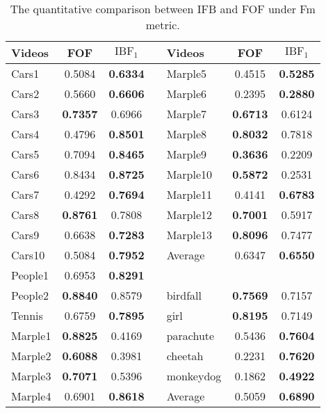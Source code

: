 \begin{table}[!t]				%
\caption{The quantitative comparison between IFB and FOF \cite{6751306_2013_ICCV} under Fm metric.}
\label{tab_ICCV}
\centering
\begin{tabular}{lcc|clcc}
\hline
Videos   & FOF\cite{6751306_2013_ICCV} & $\text{IBF}_1$  & & Videos & FOF\cite{6751306_2013_ICCV} & $\text{IBF}_1$ \\
\hline
Cars1   &  0.5084 &   \textbf{0.6334} & &  Marple5   &  0.4515 &  \textbf{0.5285} \\
Cars2   &  0.5660 &   \textbf{0.6606} & &  Marple6   &  0.2395 &  \textbf{0.2880} \\
Cars3   &   \textbf{0.7357} &  0.6966 & &  Marple7   &  \textbf{0.6713} &  0.6124 \\
Cars4   &  0.4796 &  \textbf{0.8501} & &  Marple8   &  \textbf{0.8032} &  0.7818 \\
Cars5   &  0.7094 &  \textbf{0.8465} & &  Marple9   &  \textbf{0.3636} &  0.2209 \\
Cars6   &  0.8434 &  \textbf{0.8725} & &  Marple10  &  \textbf{0.5872} &  0.2531 \\
Cars7   &  0.4292 &  \textbf{0.7694} & &  Marple11  &  0.4141 &  \textbf{0.6783} \\
Cars8   &  \textbf{0.8761} &  0.7808 & &  Marple12  &  \textbf{0.7001} &  0.5917 \\
Cars9   &  0.6638 &  \textbf{0.7283} & &  Marple13  &  \textbf{0.8096} &  0.7477 \\
\cline{5-7}
Cars10  &  0.5084 &  \textbf{0.7952} & &  Average   &  0.6347 &  \textbf{0.6550} \\
\cline{4-7}
People1 &  0.6953 &  \textbf{0.8291}                &         &         \\
\cline{4-7}
People2 &  \textbf{0.8840} &  0.8579 & &  birdfall  &  \textbf{0.7569} &  0.7157 \\
Tennis  &  0.6759 &  \textbf{0.7895} & &  girl      &  \textbf{0.8195} &  0.7149 \\
Marple1 &  \textbf{0.8825} &  0.4169 & &  parachute &  0.5436 &  \textbf{0.7604} \\
Marple2 &  \textbf{0.6088} &  0.3981 & &  cheetah   &  0.2231 &  \textbf{0.7620} \\
Marple3 &  \textbf{0.7071} &  0.5396 & &  monkeydog &  0.1862 &  \textbf{0.4922} \\
\cline{5-7}
Marple4 &  0.6901 &  \textbf{0.8618} & &  Average    &  0.5059 &  \textbf{0.6890} \\
\hline
\end{tabular}
\end{table}


